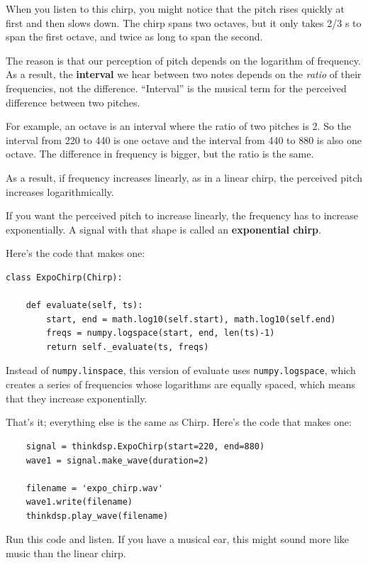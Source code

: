 \documentclass[12pt]{book}
\begin{document}
When you listen to this chirp, you might notice that the pitch
rises quickly at first and then slows down.
The chirp spans two octaves, but it only takes 2/3 s to span
the first octave, and twice as long to span the second.  

The reason is that our perception of pitch depends on the logarithm of
frequency.  As a result, the {\bf interval} we hear between two notes
depends on the {\em ratio} of their frequencies, not the difference.
``Interval'' is the musical term for the perceived difference between
two pitches.

For example, an octave is an interval where the ratio of two
pitches is 2.  So the interval from 220 to 440 is one octave
and the interval from 440 to 880 is also one octave.  The difference
in frequency is bigger, but the ratio is the same.

As a result, if frequency increases linearly, as in a linear
chirp, the perceived pitch increases logarithmically.

If you want the perceived pitch to increase linearly, the frequency
has to increase exponentially.  A signal with that shape is called
an {\bf exponential chirp}.

Here's the code that makes one:

\begin{verbatim}
class ExpoChirp(Chirp):
    
    def evaluate(self, ts):
        start, end = math.log10(self.start), math.log10(self.end)
        freqs = numpy.logspace(start, end, len(ts)-1)
        return self._evaluate(ts, freqs)
\end{verbatim}

Instead of {\tt numpy.linspace}, this version of evaluate uses
{\tt numpy.logspace}, which creates a series of frequencies
whose logarithms are equally spaced, which means that they increase
exponentially.

That's it; everything else is the same as Chirp.  Here's the code
that makes one:

\begin{verbatim}
    signal = thinkdsp.ExpoChirp(start=220, end=880)
    wave1 = signal.make_wave(duration=2)

    filename = 'expo_chirp.wav'
    wave1.write(filename)
    thinkdsp.play_wave(filename)
\end{verbatim}

Run this code and listen.  If you have a musical ear, this might
sound more like music than the linear chirp.
\end{document}
